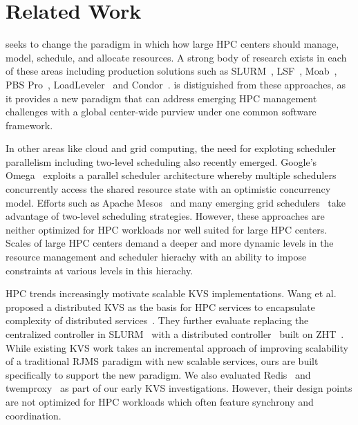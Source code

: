 \section{Related Work}
\flux seeks to change the paradigm in which 
how large HPC centers should manage, model, schedule, and
allocate resources. 
A strong body of research exists in each of these areas 
including production solutions such as SLURM~\cite{Jette02slurm}, 
LSF~\cite{LSF}, Moab~\cite{MOAB}, 
PBS Pro~\cite{PSBPro}, LoadLeveler~\cite{LL}
and Condor~\cite{Litzkow88}.
\flux is distiguished from these approaches, as it provides
a new paradigm that can address emerging HPC management challenges 
with a global center-wide purview under one common 
software framework. 

In other areas like cloud and grid computing, the need 
for exploting scheduler parallelism including two-level 
scheduling also recently emerged. 
Google's Omega~\cite{Omega} exploits 
a parallel scheduler architecture whereby multiple
schedulers concurrently access the shared resource state
with an optimistic concurrency model. Efforts
such as Apache Mesos~\cite{Mesos} and many emerging
grid schedulers~\cite{MultilevelGrid,Oar} 
take advantage of two-level scheduling strategies.
However, these approaches are neither optimized for HPC workloads 
nor well suited for large HPC centers. 
Scales of large HPC centers demand a deeper 
and more dynamic levels in the resource management 
and scheduler hierachy with an ability to impose constraints 
at various levels in this hierachy.

HPC trends increasingly motivate scalable KVS implementations. 
Wang et al. proposed a distributed KVS 
as the basis for HPC services to encapsulate
complexity of distributed services~\cite{Wang:2013:USE:2503210.2503239}.
%
They further evaluate replacing the centralized controller in
SLURM~\cite{Jette02slurm} with a distributed controller~\cite{Slurmpp}
built on ZHT~\cite{Li:2013:ZLR:2510661.2511401}.
While existing KVS work takes an incremental approach of improving 
scalability of a traditional RJMS paradigm with new scalable services,
ours are built specifically to support the new paradigm. 
We also evaluated Redis~\cite{Redis} and twemproxy~\cite{Twemproxy}
as part of our early KVS investigations.
However, their design points are not optimized
for HPC workloads which often feature synchrony and coordination. 
%

